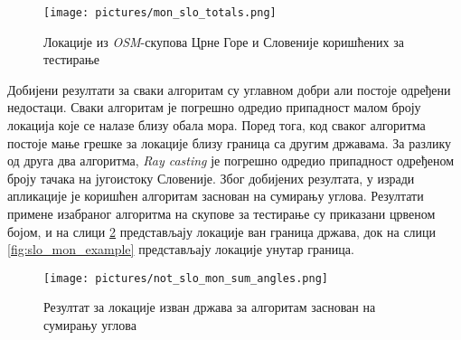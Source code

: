 \documentclass[12pt,oneside]{memoir}
\begin{document}
\begin{figure}[!ht]
  \centering
  \texttt{[image: pictures/mon\_slo\_totals.png]}
  \caption{Локације из \textit{OSM}-скупова Црне Горе и Словеније коришћених за тестирање}
  \label{fig:all_map_slo_mon_example}
\end{figure}



Добијени резултати за сваки алгоритам су углавном добри али постоје одређени недостаци. Сваки алгоритам је погрешно одредио припадност малом броју локација које се налазе близу обала мора. Поред тога, код сваког алгоритма постоје мање грешке за локације близу граница са другим државама. За разлику од друга два алгоритма, \textit{Ray casting} је погрешно одредио припадност одређеном броју тачака на југоистоку Словеније. Због добијених резултата, у изради апликације је коришћен алгоритам заснован на сумирању углова. Резултати примене изабраног алгоритма на скупове за тестирање су приказани црвеном бојом, и на слици \ref{fig:not_slo_mon_example} представљају локације ван граница држава, док на слици \ref{fig:slo_mon_example} представљају локације унутар граница.

\begin{figure}[!ht]
  \centering
  \texttt{[image: pictures/not\_slo\_mon\_sum\_angles.png]}
  \caption{Резултат за локације изван држава за алгоритам заснован на сумирању углова}
  \label{fig:not_slo_mon_example}
\end{figure}
\end{document}
